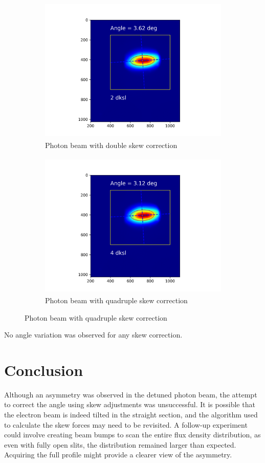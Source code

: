 \documentclass[a4paper,12pt]{article}
\begin{document}
\begin{figure}[H]
\centering
\begin{subfigure}{0.4\textwidth}
\includegraphics[width=1\linewidth, height=7cm]{2dksl_coupling_angle.png} 
\caption{Photon beam with double skew correction}
\end{subfigure}
\begin{subfigure}{0.4\textwidth}
\includegraphics[width=1\linewidth, height=7cm]{4dksl_coupling_angle.png}
\caption{Photon beam with quadruple skew correction}
\end{subfigure}
\label{fig:meas_angle_2}
\end{figure}

No angle variation was observed for any skew correction.

\section{Conclusion}
\par Although an asymmetry was observed in the detuned
 photon beam, the attempt to correct the angle using skew 
 adjustments was unsuccessful. It is possible that the electron
  beam is indeed tilted in the straight section, and the algorithm
   used to calculate the skew forces may need to be revisited. A follow-up
    experiment could involve creating beam bumps to scan the entire flux density
     distribution, as even with fully open slits, the distribution remained larger
      than expected. Acquiring the full profile might provide a clearer view of the
       asymmetry.
\end{document}
